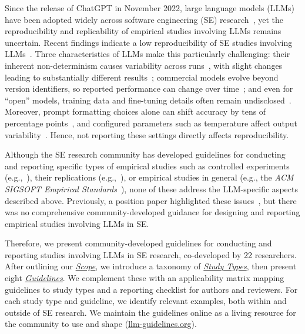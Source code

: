 \documentclass[smallextended]{svjour3}
\newcommand{\scope}{\hyperref[sec:scope]{\emph{Scope}}\xspace}
\newcommand{\scope}{\href{/scope/}{\emph{Scope}}\xspace}
\newcommand{\studytypes}{\hyperref[sec:study-types]{\emph{Study Types}}\xspace}
\newcommand{\studytypes}{\href{/study-types}{\emph{Study Types}}\xspace}
\newcommand{\guidelines}{\hyperref[sec:guidelines]{\emph{Guidelines}}\xspace}
\newcommand{\guidelines}{\href{/guidelines}{\emph{Guidelines}}\xspace}
\begin{document}
Since the release of ChatGPT in November 2022, large language models (LLMs) have been adopted widely across software engineering (SE) research~\cite{DBLP:journals/tosem/HouZLYWLLLGW24}, yet the reproducibility and replicability of empirical studies involving LLMs remains uncertain.
Recent findings indicate a low reproducibility of SE studies involving LLMs~\cite{DBLP:journals/corr/abs-2510-25506}.
Three characteristics of LLMs make this particularly challenging:
their inherent non-determinism causes variability across runs~\cite{DBLP:conf/naacl/SongWLL25, DBLP:journals/corr/abs-2602-07150}, with slight changes leading to substantially different results~\cite{DBLP:conf/nips/AgarwalSCCB21, DBLP:journals/corr/abs-2412-12509};
commercial models evolve beyond version identifiers, so reported performance can change over time~\cite{DBLP:journals/corr/abs-2307-09009};
and even for ``open'' models, training data and fine-tuning details often remain undisclosed~\cite{Gibney2024}.
Moreover, prompt formatting choices alone can shift accuracy by tens of percentage points~\cite{DBLP:conf/iclr/Sclar0TS24}, and configured parameters such as temperature affect output variability~\cite{renze2024temperature}.
Hence, not reporting these settings directly affects reproducibility.

Although the SE research community has developed guidelines for conducting and reporting specific types of empirical studies such as controlled experiments (e.g.,~\cite{DBLP:books/sp/WohlinRHORW24, DBLP:books/sp/08/SSS2008}), their replications (e.g.,~\cite{DBLP:journals/tse/SantosVOJ21}), or empirical studies in general (e.g., the \emph{ACM SIGSOFT Empirical Standards}~\cite{ralph2021empiricalstandardssoftwareengineering}), none of these address the LLM-specific aspects described above.
Previously, a position paper highlighted these issues~\cite{DBLP:conf/wsese/0001BFB25}, but there was no comprehensive community-developed guidance for designing and reporting empirical studies involving LLMs in SE.

Therefore, we present community-developed guidelines for conducting and reporting studies involving LLMs in SE research, co-developed by 22 researchers.
After outlining our \scope, we introduce a taxonomy of \studytypes, then present eight \guidelines.
We complement these with an applicability matrix mapping guidelines to study types and a reporting checklist for authors and reviewers.
For each study type and guideline, we identify relevant examples, both within and outside of SE research.
We maintain the guidelines online as a living resource for the community to use and shape (\href{https://llm-guidelines.org/}{llm-guidelines.org}).
 
\end{document}
